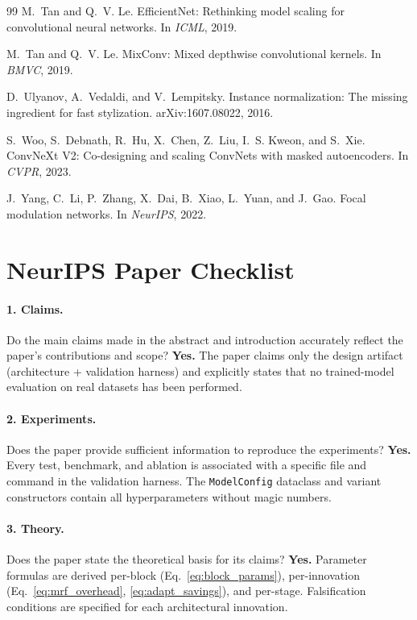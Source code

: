 \documentclass{article}
\begin{document}
{\begin{thebibliography}{99}
M.~Tan and Q.~V. Le.
EfficientNet: Rethinking model scaling for convolutional neural
networks.
In \textit{ICML}, 2019.

M.~Tan and Q.~V. Le.
MixConv: Mixed depthwise convolutional kernels.
In \textit{BMVC}, 2019.

D.~Ulyanov, A.~Vedaldi, and V.~Lempitsky.
Instance normalization: The missing ingredient for fast stylization.
arXiv:1607.08022, 2016.

S.~Woo, S.~Debnath, R.~Hu, X.~Chen, Z.~Liu, I.~S. Kweon, and S.~Xie.
ConvNeXt V2: Co-designing and scaling ConvNets with masked
autoencoders.
In \textit{CVPR}, 2023.

J.~Yang, C.~Li, P.~Zhang, X.~Dai, B.~Xiao, L.~Yuan, and J.~Gao.
Focal modulation networks.
In \textit{NeurIPS}, 2022.

\end{thebibliography}
}

\appendix
\section{NeurIPS Paper Checklist}

\paragraph{1. Claims.}
Do the main claims made in the abstract and introduction accurately
reflect the paper's contributions and scope?
\textbf{Yes.}  The paper claims only the design artifact (architecture
+ validation harness) and explicitly states that no trained-model
evaluation on real datasets has been performed.

\paragraph{2. Experiments.}
Does the paper provide sufficient information to reproduce the
experiments?
\textbf{Yes.}  Every test, benchmark, and ablation is associated with a
specific file and command in the validation harness.  The
\texttt{ModelConfig} dataclass and variant constructors contain all
hyperparameters without magic numbers.

\paragraph{3. Theory.}
Does the paper state the theoretical basis for its claims?
\textbf{Yes.}  Parameter formulas are derived per-block
(Eq.~\ref{eq:block_params}), per-innovation
(Eq.~\ref{eq:mrf_overhead}, \ref{eq:adapt_savings}), and per-stage.
Falsification conditions are specified for each architectural
innovation.
\end{document}
